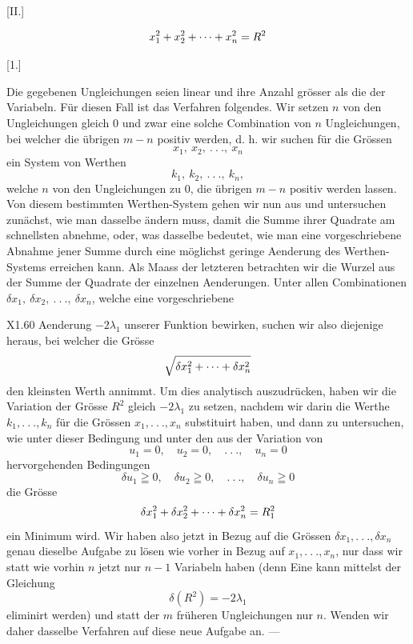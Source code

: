 \clearpage{}\NoSourceHead
{}
\begin{center}[II.]\end{center}
\[
x_1^2+x_2^2+\mathinner{\cdotp\cdotp\cdotp}+x_n^2=R^2
\]
\begin{center}[1.]\end{center}
\indent Die gegebenen Ungleichungen seien linear und ihre Anzahl grösser als die der Variabeln. Für diesen Fall ist das Verfahren folgendes. Wir setzen \(n\) von den Ungleichungen gleich 0 und zwar eine solche Combination von \(n\) Ungleichungen, bei welcher die übrigen \(m-n\) positiv werden, d. h. wir suchen für die Grössen
\[
x_1,\ x_2,\ .\ .\ .,\ x_n
\]
\noindent ein System von Werthen
\[
k_1,\ k_2,\ .\ .\ .,\ k_n,
\]
\noindent welche \(n\) von den Ungleichungen zu 0, die übrigen \(m-n\) positiv werden lassen. Von diesem bestimmten Werthen-System gehen wir nun aus und untersuchen zunächst, wie man dasselbe ändern muss, damit die Summe ihrer Quadrate am schnellsten abnehme, oder, was dasselbe bedeutet, wie man eine vorgeschriebene Abnahme jener Summe durch eine möglichst geringe Aenderung des Werthen-Systems erreichen kann. Als Maass der letzteren betrachten wir die Wurzel aus der Summe der Quadrate der einzelnen Aenderungen. Unter allen Combinationen \(\delta x_1,\ \delta x_2,\ .\ .\ .,\ \delta x_n\), welche eine vorgeschriebene
\par\vfill\noindent X1.\hfill60
\clearpage{}
\noindent Aenderung \(-2\lambda_1\) unserer Funktion bewirken, suchen wir also diejenige heraus, bei welcher die Grösse
\[
\sqrt{\delta x_1^2+\mathinner{\cdotp\cdotp\cdotp}+\delta x_n^2}
\]
\noindent den kleinsten Werth annimmt. Um dies analytisch auszudrücken, haben wir die Variation der Grösse \(R^2\) gleich \(-2\lambda_1\) zu setzen, nachdem wir darin die Werthe \(k_1,.\ .\ .,k_n\) für die Grössen \(x_1,.\ .\ .,x_n\) substituirt haben, und dann zu untersuchen, wie unter dieser Bedingung und unter den aus der Variation von
\[
u_1=0,\quad u_2=0,\quad .\ .\ .,\quad u_n=0
\]
\noindent hervorgehenden Bedingungen
\[
\delta u_1\geqq 0,\quad\delta u_2\geqq 0,\quad .\ .\ .,\quad\delta u_n\geqq 0
\]
\noindent die Grösse
\[
\delta x_1^2+\delta x_2^2+\mathinner{\cdotp\cdotp\cdotp}+\delta x_n^2=R_1^2
\]
\noindent ein Minimum wird. Wir haben also jetzt in Bezug auf die Grössen \(\delta x_1,.\ .\ .,\delta x_n\) genau dieselbe Aufgabe zu lösen wie vorher in Bezug auf \(x_1,.\ .\ .,x_n\), nur dass wir statt wie vorhin \(n\) jetzt nur \(n-1\) Variabeln haben (denn Eine kann mittelst der Gleichung
\[
\delta(R^2)=-2\lambda_1
\]
\noindent eliminirt werden) und statt der \(m\) früheren Ungleichungen nur \(n\). Wenden wir daher dasselbe Verfahren auf diese neue Aufgabe an. —

